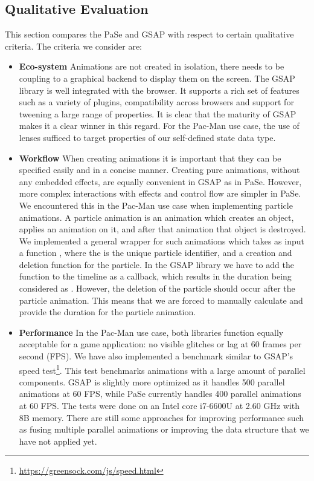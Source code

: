 \subsection{Qualitative Evaluation}

This section compares the PaSe and GSAP with respect to certain qualitative criteria. The criteria we consider are:

\begin{itemize}
\item \textbf{Eco-system} Animations are not created in isolation, there needs to be coupling to a graphical backend to display them on the screen. The GSAP library is well integrated with the browser. It supports a rich set of features such as a variety of plugins, compatibility across browsers and support for tweening a large range of properties. It is clear that the maturity of GSAP makes it a clear winner in this regard. For the Pac-Man use case, the use of lenses sufficed to target properties of our self-defined state data type.
\item \textbf{Workflow} When creating animations it is important that they can be specified easily and in a concise manner. Creating pure animations, without any embedded effects, are equally convenient in GSAP as in PaSe. However, more complex interactions with effects and control flow are simpler in PaSe. We encountered this in the Pac-Man use case when implementing particle animations. A particle animation is an animation which creates an object, applies an animation on it, and after that animation that object is destroyed. We implemented a general wrapper for such animations which takes as input a function , where the  is the unique particle identifier, and a creation and deletion function for the particle. In the GSAP library we have to add the function to the timeline as a callback, which results in the duration being considered as . However, the deletion of the particle should occur after the particle animation. This means that we are forced to manually calculate and provide the duration for the particle animation.
\item \textbf{Performance} In the Pac-Man use case, both libraries function equally acceptable for a game application: no visible glitches or lag at 60 frames per second (FPS). We have also implemented a benchmark similar to GSAP's speed test\footnote{\url{https://greensock.com/js/speed.html}}. This test benchmarks animations with a large amount of parallel components. GSAP is slightly more optimized as it handles 500 parallel animations at 60 FPS, while PaSe currently handles 400 parallel animations at 60 FPS. The tests were done on an Intel core i7-6600U at 2.60 GHz with 8B memory. There are still some approaches for improving performance such as fusing multiple parallel animations or improving the  data structure that we have not applied yet.

\end{itemize}
